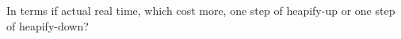   In terms if actual real time, which cost more, one step of
  heapify-up or one step of heapify-down?
